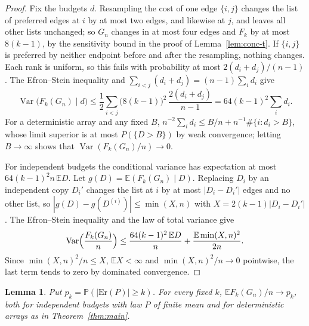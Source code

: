 \documentclass[11pt]{amsart}
\newtheorem{lemma}[theorem]{Lemma}
\theoremstyle{remark}
\numberwithin{equation}{section}
\newcommand{\E}{\mathbb E}
\newcommand{\Pp}{\mathbb P}
\newcommand{\1}{\mathbf 1}
\newcommand{\Er}{\mathrm{Er}}
\begin{document}
\begin{proof}
Fix the budgets $d$. Resampling the cost of one edge $\{i,j\}$ changes the list of preferred edges at $i$ by at most two edges, and likewise at $j$, and leaves all other lists unchanged; so $G_n$ changes in at most four edges and $F_k$ by at most $8(k-1)$, by the sensitivity bound in the proof of Lemma~\ref{lem:conc-t}. If $\{i,j\}$ is preferred by neither endpoint before and after the resampling, nothing changes. Each rank is uniform, so this fails with probability at most $2(d_i+d_j)/(n-1)$. The Efron--Stein inequality and $\sum_{i<j}(d_i+d_j)=(n-1)\sum_id_i$ give
\[
\operatorname{Var}\bigl(F_k(G_n)\mid d\bigr)\le\frac12\sum_{i<j}\bigl(8(k-1)\bigr)^2\,\frac{2(d_i+d_j)}{n-1}=64(k-1)^2\sum_id_i .
\]
For a deterministic array and any fixed $B$, $n^{-2}\sum_id_i\le B/n+n^{-1}\#\{i:d_i>B\}$, whose limit superior is at most $P(\{D>B\})$ by weak convergence; letting $B\to\infty$ shows that $\operatorname{Var}(F_k(G_n)/n)\to0$.

For independent budgets the conditional variance has expectation at most $64(k-1)^2n\,\E D$. Let $g(D)=\E(F_k(G_n)\mid D)$. Replacing $D_i$ by an independent copy $D_i'$ changes the list at $i$ by at most $|D_i-D_i'|$ edges and no other list, so $|g(D)-g(D^{(i)})|\le\min(X,n)$ with $X=2(k-1)|D_i-D_i'|$. The Efron--Stein inequality and the law of total variance give
\[
\operatorname{Var}\Bigl(\frac{F_k(G_n)}n\Bigr)\le\frac{64(k-1)^2\,\E D}{n}+\frac{\E\min(X,n)^2}{2n}.
\]
Since $\min(X,n)^2/n\le X$, $\E X<\infty$ and $\min(X,n)^2/n\to0$ pointwise, the last term tends to zero by dominated convergence.
\end{proof}

\begin{lemma}\label{lem:mean}
Put $p_k=\Pp(|\Er(P)|\ge k)$. For every fixed $k$, $\E F_k(G_n)/n\to p_k$, both for independent budgets with law $P$ of finite mean and for deterministic arrays as in Theorem~\ref{thm:main}.
\end{lemma}
\end{document}
